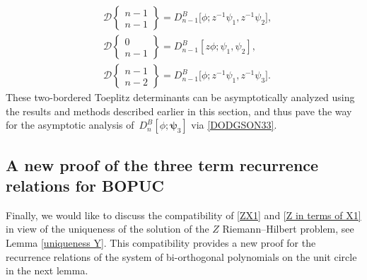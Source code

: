 \documentclass[pdftex]{sigma}
\numberwithin{equation}{section}
\begin{document}
\begin{Remark}
\begin{align}
				&\mathcal{D}\left\lbrace \begin{matrix} n-1 \\ n-1 \end{matrix} \right\rbrace = D^B_{n-1}\big[\phi;z^{-1}\psi_1,z^{-1}\psi_2\big], \\
			&	\mathcal{D}\left\lbrace \begin{matrix} 0 \\ n-1 \end{matrix} \right\rbrace = D^B_{n-1}[z\phi;\psi_1,\psi_2], \\
			&	\mathcal{D}\left\lbrace \begin{matrix} n-1 \\ n-2 \end{matrix} \right\rbrace = D^B_{n-1}\big[\phi;z^{-1}\psi_1,z^{-1}\psi_3\big]. \label{E44}
			\end{align}
			These two-bordered Toeplitz determinants can be asymptotically analyzed using the results and methods described earlier in this section, and thus pave the way for the asymptotic analysis of~${D^B_n[\phi;\boldsymbol{\psi}_3]}$ via \eqref{DODGSON33}.
		\end{Remark}
		
		\subsection{A new proof of the three term recurrence relations for BOPUC}
		Finally, we would like to discuss the compatibility of \eqref{ZX1} and \eqref{Z in terms of X1} in view of the uniqueness of the solution of the $Z$ Riemann--Hilbert problem, see Lemma \ref{uniqueness Y}. This compatibility provides a new proof for the recurrence relations of the system of bi-orthogonal polynomials on the unit circle in the next lemma.
		
\end{document}
